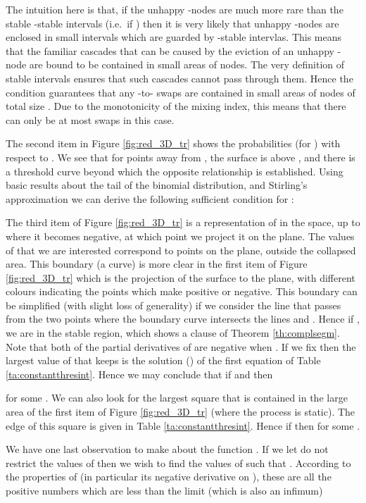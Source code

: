 \documentclass[11pt]{article}
\theoremstyle{plain}
\numberwithin{equation}{subsection}
\begin{document}
The intuition here is that, if the unhappy -nodes are much more rare than the
stable -stable intervals (i.e.\  if )  then it is very likely that unhappy
-nodes are enclosed in small intervals which are guarded by -stable intervlas. This means that
the familiar cascades that can be caused by the eviction of an unhappy -node are bound to be contained in small
areas of nodes. The very definition of stable intervals ensures that such cascades cannot pass through them. Hence the condition
  guarantees that any -to- swaps are contained in small areas of nodes of total size .
 Due to the monotonicity of the mixing index, this means that there can only be at most 
  swaps in this case.
 
The second item in Figure \ref{fig:red_3D_tr} shows the probabilities  (for )
with respect to . We see that for points away from , the surface  is above , 
and there is a threshold curve beyond which the opposite relationship is established.
Using basic results about the tail of the binomial distribution, and Stirling's approximation
we can derive the following sufficient condition for :

The third item of Figure \ref{fig:red_3D_tr}
is a representation of  in the space, up to where
it becomes negative, at which point we project it on the plane.
The values of  that we are interested correspond to points
on the plane, outside the collapsed area.
This boundary (a curve) is more clear in the first 
item of Figure \ref{fig:red_3D_tr} which is the projection of the
surface to the plane, with different colours indicating the points
which make  positive or negative.
This boundary can be simplified (with slight loss of generality) if we consider the line
that passes from the two points where the boundary curve intersects the lines  and .
Hence if , we are in the stable region, which shows a clause of Theorem \ref{th:complsegm}. 
Note that both of the partial derivatives of  are negative 
when .
If we fix  then the largest value of  that keeps 
is the solution () of the first equation
of Table \ref{ta:constantthresint}. 
Hence we may conclude that
if   
and  then 

for some .
We can also look for the largest square that is contained 
in the large area of the first item of Figure \ref{fig:red_3D_tr} (where the process is static).
The edge of this square is given in Table \ref{ta:constantthresint}.
Hence if  
then 
for some .


We have one last observation to make about the function .
If we let do not restrict the values of  then we wish to
find the values of  such that . According to the properties of
 (in particular its negative derivative on ), 
these are all the positive numbers which are less than the limit 
(which is also an infimum)
\end{document}

